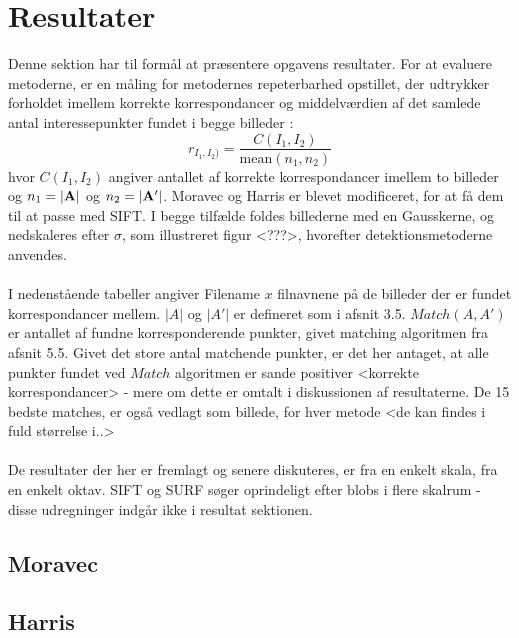\chapter{Resultater}
Denne sektion har til formål at præsentere opgavens resultater. For at evaluere metoderne, er en måling for metodernes repeterbarhed opstillet, der udtrykker forholdet imellem korrekte korrespondancer og middelværdien af det samlede antal interessepunkter fundet i begge billeder \cite{eval}:
\begin{equation}
r_{I_1,I_2)}=\dfrac{C(I_1,I_2)}{\text{mean}(n_1,n_2)}
\end{equation}
hvor $C(I_1,I_2)$ angiver antallet af korrekte korrespondancer imellem to billeder og $n_1=\bold{|A|}$ og $n_2=\bold{|A'|}$.
Moravec og Harris er blevet modificeret, for at få dem til at passe med SIFT. I begge tilfælde foldes billederne med en Gausskerne, og nedskaleres efter $\sigma$, som illustreret figur <???>, hvorefter detektionsmetoderne anvendes. 
\\
\\
I nedenstående tabeller angiver Filename $x$ filnavnene på de billeder der er fundet korrespondancer mellem. $|A|$ og $|A'|$ er defineret som i afsnit 3.5. $Match(A, A')$ er antallet af fundne korresponderende punkter, givet matching algoritmen fra afsnit 5.5. Givet det store antal matchende punkter, er det her antaget, at alle punkter fundet ved $Match$ algoritmen er sande positiver <korrekte korrespondancer> - mere om dette er omtalt i diskussionen af resultaterne. De 15 bedste matches, er også vedlagt som billede, for hver metode <de kan findes i fuld størrelse i..>
\\
\\
De resultater der her er fremlagt og senere diskuteres, er fra en enkelt skala, fra en enkelt oktav. SIFT og SURF søger oprindeligt efter blobs i flere skalrum - disse udregninger indgår ikke i resultat sektionen. 
\section{Moravec}
\section{Harris}


